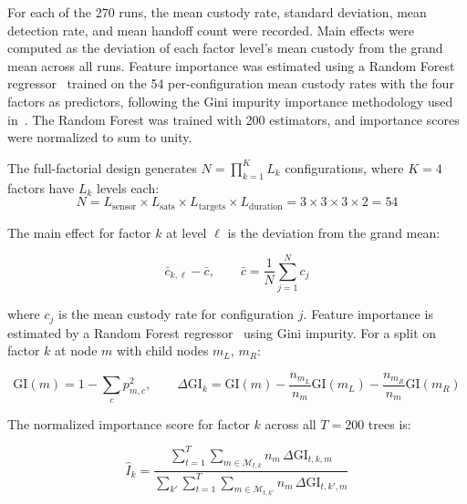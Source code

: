 \documentclass[]{spie}
\begin{document}
For each of the 270 runs, the mean custody rate, standard deviation, mean detection rate, and mean handoff count were recorded. Main effects were computed as the deviation of each factor level's mean custody from the grand mean across all runs. Feature importance was estimated using a Random Forest regressor~\cite{Breiman2001} trained on the 54 per-configuration mean custody rates with the four factors as predictors, following the Gini impurity importance methodology used in~\cite{Saeed2025DOEFramework}. The Random Forest was trained with 200 estimators, and importance scores were normalized to sum to unity.

The full-factorial design generates 
$N = \prod_{k=1}^{K} L_k$ configurations, 
where $K = 4$ factors have $L_k$ levels each:
\begin{equation}
    N = L_{\mathrm{sensor}} \times 
    L_{\mathrm{sats}} \times 
    L_{\mathrm{targets}} \times 
    L_{\mathrm{duration}} = 
    3 \times 3 \times 3 \times 2 = 54
    \label{eq:factorial}
\end{equation}

The main effect for factor $k$ at level $\ell$ 
is the deviation from the grand mean:

\begin{equation}
    \bar{c}_{k,\ell} - \bar{c}, \qquad 
    \bar{c} = \frac{1}{N}\sum_{j=1}^{N} c_j
    \label{eq:main_effect}
\end{equation}

where $c_j$ is the mean custody rate for configuration $j$. Feature importance is 
estimated by a Random Forest regressor~\cite{Breiman2001} using Gini 
impurity. For a split on factor $k$ at node $m$ with child nodes $m_L$, $m_R$:

\begin{equation}
    \mathrm{GI}(m) = 1 - \sum_{c} p_{m,c}^2, 
    \qquad
    \Delta\mathrm{GI}_k = \mathrm{GI}(m) - 
    \frac{n_{m_L}}{n_m}\mathrm{GI}(m_L) - 
    \frac{n_{m_R}}{n_m}\mathrm{GI}(m_R)
    \label{eq:gini}
\end{equation}

The normalized importance score for factor 
$k$ across all $T = 200$ trees is:

\begin{equation}
    \hat{I}_k = \frac{\sum_{t=1}^{T} 
    \sum_{m \in \mathcal{M}_{t,k}} 
    n_m\, \Delta\mathrm{GI}_{t,k,m}}
    {\sum_{k'} \sum_{t=1}^{T} 
    \sum_{m \in \mathcal{M}_{t,k'}} 
    n_m\, \Delta\mathrm{GI}_{t,k',m}}
    \label{eq:importance}
\end{equation}
\end{document}
